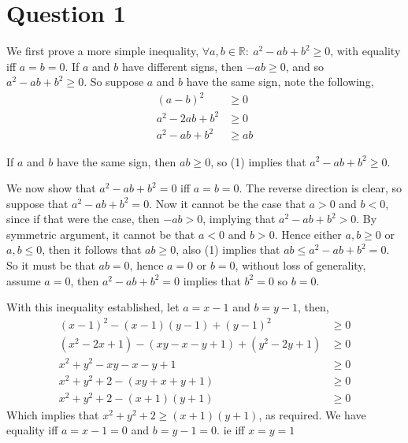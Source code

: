 \documentclass[11pt]{article}
\begin{document}
\section*{Question 1}
We first prove a more simple inequality, $\forall a,b\in\mathbb{R}:\: a^2-ab+b^2\geq0$,
with equality iff $a=b=0$. If $a$ and $b$ have different signs, then $-ab\geq0$,
and so $a^2-ab+b^2\geq0$. So suppose $a$ and $b$ have the same sign, note the following,
\begin{align}
	(a-b)^2 & \geq0 \nonumber \\
	a^2-2ab+b^2 & \geq0 \nonumber \\
	a^2-ab+b^2 & \geq ab 
\end{align}

If $a$ and $b$ have the same sign, then $ab\geq0$, so (1) implies that $a^2-ab+b^2\geq0$.

We now show that $a^2-ab+b^2=0$ iff $a=b=0$. The reverse direction is clear,
so suppose that $a^2-ab+b^2=0$. Now it cannot be the case that $a>0$ and $b<0$, since
if that were the case, then $-ab>0$, implying that $a^2-ab+b^2>0$. By symmetric argument,
it cannot be that $a<0$ and $b>0$. Hence either $a,b\geq0$ or $a,b\leq0$, then it follows that
$ab\geq0$, also (1) implies that $ab\leq a^2-ab+b^2=0$. So it must be that $ab=0$, hence
$a=0$ or $b=0$, without loss of generality, assume $a=0$, then $a^2-ab+b^2=0$ implies that
$b^2=0$ so $b=0$. 

With this inequality established, let $a=x-1$ and $b=y-1$, then,
\begin{align*}
	(x-1)^2-(x-1)(y-1)+(y-1)^2 & \geq 0 \\
	(x^2-2x+1)-(xy-x-y+1)+(y^2-2y+1) & \geq 0 \\
	x^2+y^2-xy-x-y+1 & \geq 0 \\ 
	x^2+y^2+2-(xy+x+y+1) & \geq 0 \\ 
	x^2+y^2+2-(x+1)(y+1) & \geq 0
\end{align*}
Which implies that $x^2+y^2+2\geq(x+1)(y+1)$, as required. We have equality iff
$a=x-1=0$ and $b=y-1=0$. ie iff $x=y=1$
\end{document}
